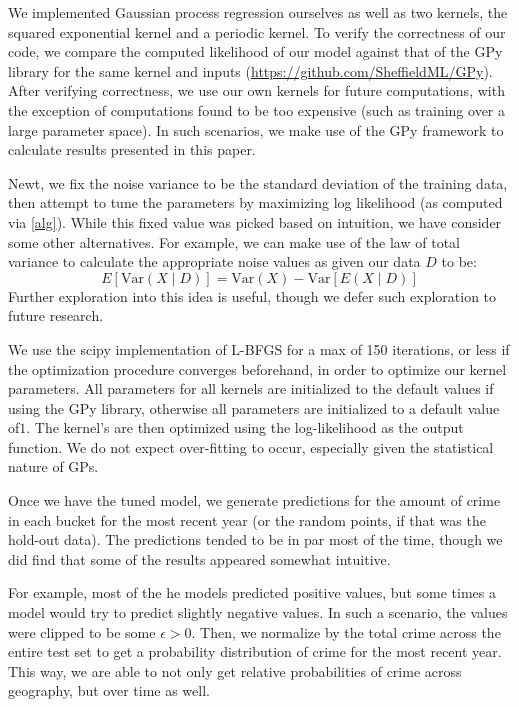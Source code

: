\documentclass[letterpaper, 11 pt, conference]{ieeeconf}  %
\begin{document}
We implemented Gaussian process regression ourselves as well as two kernels, the squared exponential kernel and a periodic kernel. To verify the correctness of our code, we compare the computed likelihood of our model against that of the GPy library for the same kernel and inputs (\url{https://github.com/SheffieldML/GPy}). After verifying correctness, we use our own kernels for future computations, with the exception of computations found to be too expensive (such as training over a large parameter space). In such scenarios, we make use of the GPy framework to calculate results presented in this paper. 

Newt, we fix the noise variance to be the standard deviation of the training data, then attempt to tune the parameters by maximizing log likelihood (as computed via \ref{alg}). While this fixed value was picked based on intuition, we have consider some other alternatives. For example, we can make use of the law of total variance to calculate the appropriate noise values as given our data $D$ to be:
$$
E[\text{Var}(X \mid D)] = \text{Var}(X) - \text{Var}[E(X \mid D)]
$$
Further exploration into this idea is useful, though we defer such exploration to future research. 

We use the scipy implementation of L-BFGS for a max of 150 iterations, or less if the optimization procedure converges beforehand, in order to optimize our kernel parameters. All parameters for all kernels are initialized to the default values if using the GPy library, otherwise all parameters are initialized to a default value of$1$. The kernel's are then optimized using the log-likelihood as the output function. We do not expect over-fitting to occur, especially given the statistical nature of GPs.  

Once we have the tuned model, we generate predictions for the amount of crime in each bucket for the most recent year (or the random points, if that was the hold-out data). The predictions tended to be in par most of the time, though we did find that some of the results appeared somewhat intuitive. 

For example, most of the he models predicted positive values, but some times a model would try to predict slightly negative values. In such a scenario, the values were clipped to be some $\epsilon > 0$. Then, we normalize by the total crime across the entire test set to get a probability distribution of crime for the most recent year. This way, we are able to not only get relative probabilities of crime across geography, but over time as well. 
\end{document}
